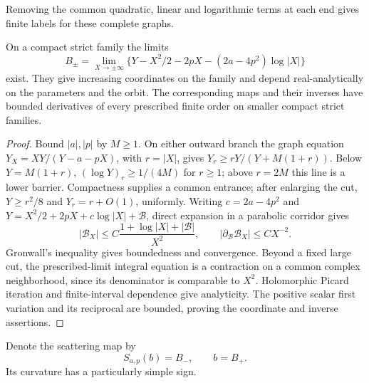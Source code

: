 Removing the common quadratic, linear and logarithmic terms at each end
gives finite labels for these complete graphs.

\begin{lemma}\label{ann:lem-renormalized-ends}
On a compact strict family the limits
\begin{equation}\label{eq:renormalized-ends}
 B_\pm=\lim_{X\to\pm\infty}
 \{Y-X^2/2-2pX-(2a-4p^2)\log|X|\}
\end{equation}
exist. They give increasing coordinates on the family and depend
real-analytically on the parameters and the orbit. The corresponding
maps and their inverses have bounded derivatives of every prescribed
finite order on smaller compact strict families.
\end{lemma}
\begin{proof}
Bound \(|a|,|p|\) by \(M\ge1\). On either outward branch the graph
equation \(Y_X=XY/(Y-a-pX)\), with \(r=|X|\), gives
\(Y_r\ge rY/(Y+M(1+r))\). Below \(Y=M(1+r)\),
\((\log Y)_r\ge1/(4M)\) for \(r\ge1\); above \(r=2M\)
this line is a lower barrier. Compactness supplies a common entrance;
after enlarging the cut, \(Y\ge r^2/8\) and \(Y_r=r+O(1)\), uniformly.
Writing \(c=2a-4p^2\) and
\(Y=X^2/2+2pX+c\log|X|+\mathcal B\), direct expansion in a
parabolic corridor gives
\[
 |\mathcal B_X|\le
 C\frac{1+\log|X|+|\mathcal B|}{X^2},
 \qquad |\partial_{\mathcal B}\mathcal B_X|\le C X^{-2}.
\]
Gronwall's inequality gives boundedness and convergence. Beyond a fixed
large cut, the prescribed-limit integral equation is a contraction on a
common complex neighborhood, since its denominator is comparable to
\(X^2\). Holomorphic Picard iteration and finite-interval dependence
give analyticity. The positive scalar first variation and its reciprocal
are bounded, proving the coordinate and inverse assertions.
\end{proof}

Denote the scattering map by
\begin{equation}\label{ann:limiting-scattering-map}
 S_{a,p}(b)=B_-,\qquad b=B_+.
\end{equation}
Its curvature has a particularly simple sign.

